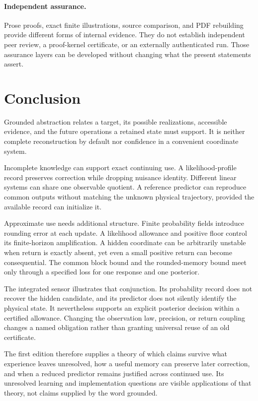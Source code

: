 \documentclass[11pt,letterpaper]{article}
\theoremstyle{plain}
\theoremstyle{definition}
\begin{document}
\paragraph{Independent assurance.} Prose proofs, exact finite illustrations, source comparison, and PDF rebuilding provide different forms of internal evidence. They do not establish independent peer review, a proof-kernel certificate, or an externally authenticated run. Those assurance layers can be developed without changing what the present statements assert.

\clearpage
\section{Conclusion}\label{sec:conclusion}
Grounded abstraction relates a target, its possible realizations, accessible evidence, and the future operations a retained state must support. It is neither complete reconstruction by default nor confidence in a convenient coordinate system.

Incomplete knowledge can support exact continuing use. A likelihood-profile record preserves correction while dropping nuisance identity. Different linear systems can share one observable quotient. A reference predictor can reproduce common outputs without matching the unknown physical trajectory, provided the available record can initialize it.

Approximate use needs additional structure. Finite probability fields introduce rounding error at each update. A likelihood allowance and positive floor control its finite-horizon amplification. A hidden coordinate can be arbitrarily unstable when return is exactly absent, yet even a small positive return can become consequential. The common block bound and the rounded-memory bound meet only through a specified loss for one response and one posterior.

The integrated sensor illustrates that conjunction. Its probability record does not recover the hidden candidate, and its predictor does not silently identify the physical state. It nevertheless supports an explicit posterior decision within a certified allowance. Changing the observation law, precision, or return coupling changes a named obligation rather than granting universal reuse of an old certificate.

The first edition therefore supplies a theory of which claims survive what experience leaves unresolved, how a useful memory can preserve later correction, and when a reduced predictor remains justified across continued use. Its unresolved learning and implementation questions are visible applications of that theory, not claims supplied by the word grounded.
\end{document}
